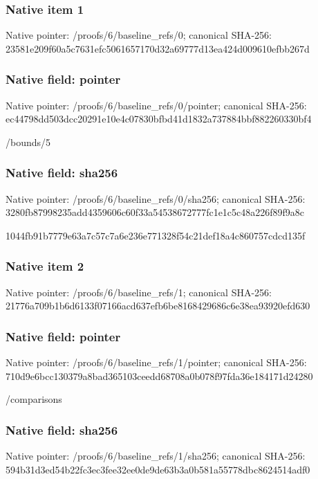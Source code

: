 \documentclass[10pt,a4paper]{article}
\begin{document}
\subsubsection{Native item 1}
Native pointer: /proofs/6/baseline\_\allowbreak{}refs/0; canonical SHA-256: 23581e209f60a5c7631efc5061657170d32a69777d13ea424d009610efbb267d

\subsubsection{Native field: pointer}
Native pointer: /proofs/6/baseline\_\allowbreak{}refs/0/pointer; canonical SHA-256: ec44798dd503dcc20291e10e4c07830bfbd41d1832a737884bbf882260330bf4

\begingroup\raggedright\sloppy /\allowbreak{}bounds/\allowbreak{}5\par\endgroup

\subsubsection{Native field: sha256}
Native pointer: /proofs/6/baseline\_\allowbreak{}refs/0/sha256; canonical SHA-256: 3280fb87998235add4359606c60f33a54538672777fc1e1c5c48a226f89f9a8c

\begingroup\raggedright\sloppy 1044fb91b7779e63a7c57c7a6e236e771328f54c21def18a4c860757cdcd135f\par\endgroup

\subsubsection{Native item 2}
Native pointer: /proofs/6/baseline\_\allowbreak{}refs/1; canonical SHA-256: 21776a709b1b6d6133f07166acd637efb6be8168429686c6e38ea93920efd630

\subsubsection{Native field: pointer}
Native pointer: /proofs/6/baseline\_\allowbreak{}refs/1/pointer; canonical SHA-256: 710d9e6bcc130379a8bad365103ceedd68708a0b078f97fda36e184171d24280

\begingroup\raggedright\sloppy /\allowbreak{}comparisons\par\endgroup

\subsubsection{Native field: sha256}
Native pointer: /proofs/6/baseline\_\allowbreak{}refs/1/sha256; canonical SHA-256: 594b31d3ed54b22fc3ec3fee32ee0de9de63b3a0b581a55778dbc8624514adf0
\end{document}
